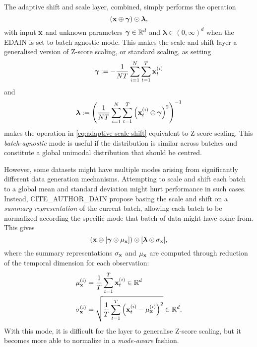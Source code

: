\documentclass{statsmsc}
\begin{document}
The adaptive shift and scale layer, combined, simply performs the operation
\begin{equation}\label{eq:adaptive-scale-shift}
    (\mathbf{x} \oplus \bm\gamma) \odot \bm\lambda,
\end{equation}
with input $\mathbf{x}$ and unknown parameters $\bm\gamma \in \mathbb{R}^d$ and $\bm\lambda \in (0,\infty)^d$ when the \ac{EDAIN} is set
to batch-agnostic mode. This makes the scale-and-shift layer a generalised version of
Z-score scaling, or standard scaling, as setting
\begin{equation}
    \bm\gamma:=-\frac{1}{N T}  \sum^{N}_{i=1} \sum^{T}_{t=1} \mathbf{x}_{t}^{(i)}
\end{equation}
and
\begin{equation}
    \bm\lambda:=\left( \frac{1}{N T} \sum^{N}_{i=1} \sum^{T}_{t=1} \left(\mathbf{x}_{t}^{(i)}\oplus \bm\gamma\right)^2  \right)^{-1}
\end{equation}
makes the operation in \cref{eq:adaptive-scale-shift} equivalent to Z-score scaling.
This \textit{batch-agnostic} mode is useful if the distribution is similar across batches
and constitute a global unimodal distribution that should be centred.

However, some datasets might have multiple modes arising from significantly different
data generation mechanisms. Attempting to scale and shift each batch to a global mean and
standard deviation might hurt performance in such cases. Instead, CITE\_AUTHOR\_DAIN propose
basing the scale and shift on a \textit{summary representation} of the current batch, allowing
each batch to be normalized according the specific mode that batch of data might have come from.
This gives
\begin{equation}
    (\mathbf{x} \oplus [\bm\gamma \odot \mu_{\mathbf{x}}]) \odot [\bm\lambda \odot \sigma_{\mathbf{x}}],
\end{equation}
where the summary representations $\sigma_{\mathbf{x}}$ and $\mu_{\mathbf{x}}$ are computed through reduction
of the temporal dimension for each observation:
\begin{align}
    \mu_{\mathbf{x}}^{(i)}&=\frac{1}{T} \sum^{T}_{t=1} \mathbf{x}^{(i)}_t \in \mathbb{R}^d \\
    \sigma_{\mathbf{x}}^{(i)}&=\sqrt{\frac{1}{T}  \sum^{T}_{t=1} \left(\mathbf{x}^{(i)}_t- \mu_{\mathbf{x}}^{(i)} \right)^2} \in \mathbb{R}^d.
\end{align}
With this mode, it is difficult for the layer to generalise Z-score scaling, but it becomes more
able to normalize in a \textit{mode-aware} fashion.

\end{document}
